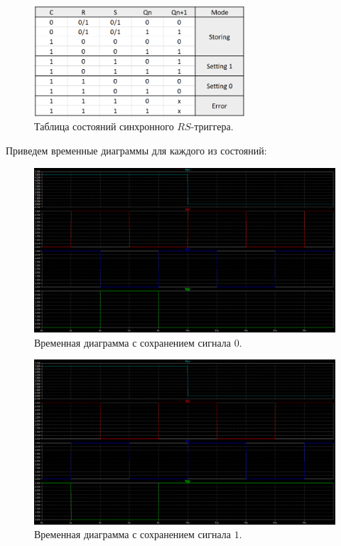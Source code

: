 \documentclass[12pt]{article}
\begin{document}
\begin{figure}[H]
    \centering
    \includegraphics[width=0.7\textwidth]{state_table.png}
    \caption{Таблица состояний синхронного $RS$-триггера.}
    \label{fig:state_table}
\end{figure}

Приведем временные диаграммы для каждого из состояний:

\begin{figure}[H]
    \centering
    \includegraphics[width=\textwidth]{graph_0.png}
    \caption{Временная диаграмма с сохранением сигнала $0$.}
    \label{fig:graph_0}
\end{figure}

\begin{figure}[H]
    \centering
    \includegraphics[width=\textwidth]{graph_1.png}
    \caption{Временная диаграмма с сохранением сигнала $1$.}
    \label{fig:graph_1}
\end{figure}
\end{document}
